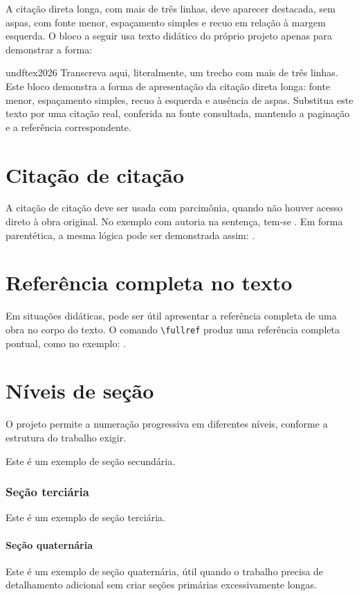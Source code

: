 A citação direta longa, com mais de três linhas, deve aparecer destacada, sem aspas, com fonte menor, espaçamento simples e recuo em relação à margem esquerda. O bloco a seguir usa texto didático do próprio projeto apenas para demonstrar a forma:

\begin{citacaolonga}[p. 1]{undftex2026}
Transcreva aqui, literalmente, um trecho com mais de três linhas. Este bloco demonstra a forma de apresentação da citação direta longa: fonte menor, espaçamento simples, recuo à esquerda e ausência de aspas. Substitua este texto por uma citação real, conferida na fonte consultada, mantendo a paginação e a referência correspondente.
\end{citacaolonga}

\section{Citação de citação}

A citação de citação deve ser usada com parcimônia, quando não houver acesso direto à obra original. No exemplo com autoria na sentença, tem-se . Em forma parentética, a mesma lógica pode ser demonstrada assim: .

\section{Referência completa no texto}

Em situações didáticas, pode ser útil apresentar a referência completa de uma obra no corpo do texto. O comando \verb|\fullref| produz uma referência completa pontual, como no exemplo: .

\section{Níveis de seção}

O projeto permite a numeração progressiva em diferentes níveis, conforme a estrutura do trabalho exigir.


Este é um exemplo de seção secundária.

\subsubsection{Seção terciária}

Este é um exemplo de seção terciária.

\paragraph{Seção quaternária}

Este é um exemplo de seção quaternária, útil quando o trabalho precisa de detalhamento adicional sem criar seções primárias excessivamente longas.
